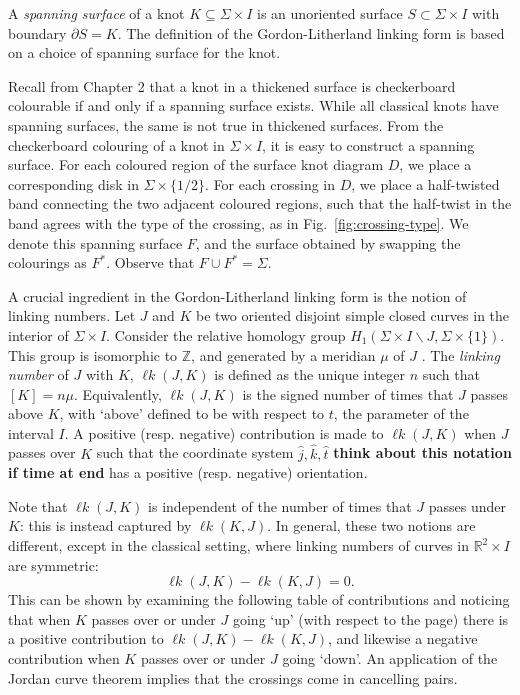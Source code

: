 \documentclass[12pt]{report}
\newcommand{\R}{\mathbb{R}}
\newcommand{\Z}{\mathbb{Z}}
\newcommand{\lk}{\operatorname{\ell\textit{k}}}
\newcommand{\notered}[1]{{\color{Red} \textbf{#1}}}
\theoremstyle{upright}
\begin{document}
A \textit{spanning surface} of a knot $K \subseteq \Sigma \times I$ is an unoriented surface $S \subset \Sigma \times I$ with boundary $\partial S = K$. The definition of the Gordon-Litherland linking form is based on a choice of spanning surface for the knot.

Recall from Chapter 2 that a knot in a thickened surface is checkerboard colourable if and only if a spanning surface exists. While all classical knots have spanning surfaces, the same is not true in thickened surfaces. From the checkerboard colouring of a knot in $\Sigma \times I$, it is easy to construct a spanning surface. For each coloured region of the surface knot diagram $D$, we place a corresponding disk in $\Sigma \times \{1/2\}$. For each crossing in $D$, we place a half-twisted band connecting the two adjacent coloured regions, such that the half-twist in the band agrees with the type of the crossing, as in Fig.~\ref{fig:crossing-type}. We denote this spanning surface $F$, and the surface obtained by swapping the colourings as $F^{*}$. Observe that $F \cup F^{*} = \Sigma$.

A crucial ingredient in the Gordon-Litherland linking form is the notion of linking numbers. Let $J$ and $K$ be two oriented disjoint simple closed curves in the interior of $\Sigma \times I$. Consider the relative homology group $H_{1}(\Sigma \times I \smallsetminus J, \Sigma \times \{1\})$. This group is isomorphic to $\Z$, and generated by a meridian $\mu$ of $J$ . The \textit{linking number} of $J$ with $K$, $\lk(J, K)$ is defined as the unique integer $n$ such that $[K] = n\mu$. Equivalently, $\lk(J, K)$ is the signed number of times that $J$ passes above $K$, with `above' defined to be with respect to $t$, the parameter of the interval $I$. A positive (resp. negative) contribution is made to $\lk(J, K)$ when $J$ passes over $K$ such that the coordinate system $\hat{j}, \hat{k}, \hat{t}$ \notered{think about this notation if time at end} has a positive (resp. negative) orientation.

Note that $\lk(J, K)$ is independent of the number of times that $J$ passes under $K$: this is instead captured by $\lk(K, J)$. In general, these two notions are different, except in the classical setting, where linking numbers of curves in $\R^{2} \times I$ are symmetric:
\[\lk(J, K) - \lk(K, J) = 0.\]
This can be shown by examining the following table of contributions and noticing that when $K$ passes over or under $J$ going `up' (with respect to the page) there is a positive contribution to $\lk(J, K) - \lk(K, J)$, and likewise a negative contribution when $K$ passes over or under $J$ going `down'. An application of the Jordan curve theorem implies that the crossings come in cancelling pairs.
\end{document}
